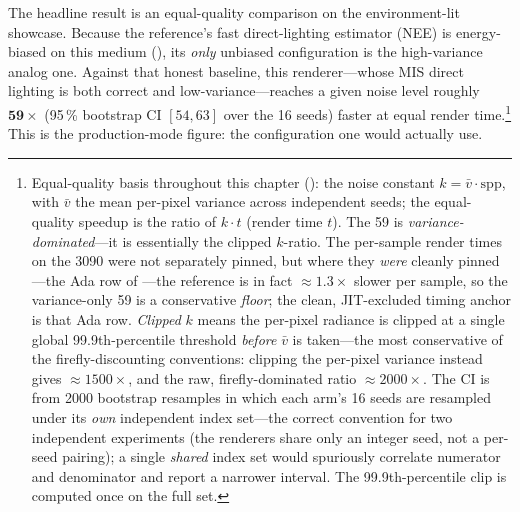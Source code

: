 The headline result is an equal-quality comparison on the environment-lit showcase. Because the
reference's fast direct-lighting estimator (NEE) is energy-biased on this medium
(), its \emph{only} unbiased configuration is the high-variance analog one.
Against that honest baseline, this renderer---whose MIS direct lighting is both correct and
low-variance---reaches a given noise level roughly \(\mathbf{59\times}\) (\num{95}\,\% bootstrap CI
\([54,63]\) over the \num{16} seeds) faster at equal render
time.\footnote{Equal-quality basis throughout this chapter (): the noise constant
$k=\bar v\cdot\mathrm{spp}$, with $\bar v$ the mean per-pixel variance across independent seeds; the
equal-quality speedup is the ratio of $k\cdot t$ (render time $t$). The \num{59} is
\emph{variance-dominated}---it is essentially the clipped $k$-ratio. The per-sample render times on the
\num{3090} were not separately pinned, but where they \emph{were} cleanly pinned---the Ada row of
---the reference is in fact $\approx\!\num{1.3}\times$ slower per sample, so the
variance-only \num{59} is a conservative \emph{floor}; the clean, JIT-excluded timing anchor is that Ada
row. \emph{Clipped} $k$ means the
per-pixel radiance is clipped at a single global \num{99.9}th-percentile threshold \emph{before} $\bar v$
is taken---the most conservative of the firefly-discounting conventions: clipping the per-pixel variance
instead gives $\approx\!\num{1500}\times$, and the raw, firefly-dominated ratio $\approx\!\num{2000}\times$.
The CI is from \num{2000} bootstrap resamples in which each arm's \num{16} seeds are resampled under its
\emph{own} independent index set---the correct convention for two independent experiments (the renderers
share only an integer seed, not a per-seed pairing); a single \emph{shared} index set would spuriously
correlate numerator and denominator and report a narrower interval. The \num{99.9}th-percentile clip is
computed once on the full set.}
This
is the production-mode figure: the configuration one would actually use.

